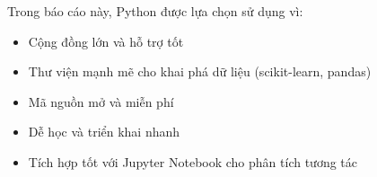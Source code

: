 Trong báo cáo này, Python được lựa chọn sử dụng \cite{hands_on_ml} vì:
\begin{itemize}
    \item Cộng đồng lớn và hỗ trợ tốt
    \item Thư viện mạnh mẽ cho khai phá dữ liệu (scikit-learn, pandas)
    \item Mã nguồn mở và miễn phí
    \item Dễ học và triển khai nhanh
    \item Tích hợp tốt với Jupyter Notebook cho phân tích tương tác
\end{itemize}
